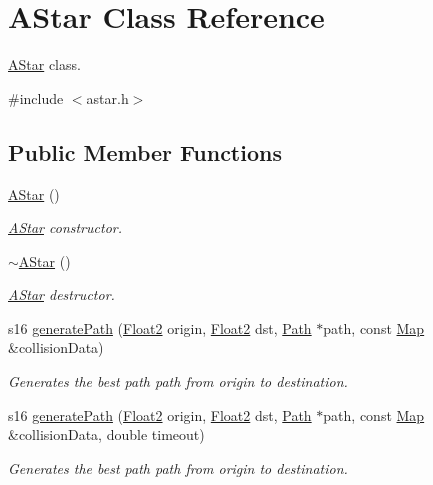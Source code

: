 \hypertarget{class_a_star}{}\section{A\+Star Class Reference}
\label{class_a_star}


\mbox{\hyperlink{class_a_star}{A\+Star}} class.  




{\ttfamily \#include $<$astar.\+h$>$}

\subsection*{Public Member Functions}
\begin{DoxyCompactItemize}
\item 
\mbox{\hyperlink{class_a_star_ab7cfaf9e1662f45f5fdce245d28c4508}{A\+Star}} ()
\begin{DoxyCompactList}\small\item\em \mbox{\hyperlink{class_a_star}{A\+Star}} constructor. \end{DoxyCompactList}\item 
\mbox{\hyperlink{class_a_star_ad246668465621db8818bbe3511fa4ae7}{$\sim$\+A\+Star}} ()
\begin{DoxyCompactList}\small\item\em \mbox{\hyperlink{class_a_star}{A\+Star}} destructor. \end{DoxyCompactList}\item 
s16 \mbox{\hyperlink{class_a_star_a1a6c23ad5e565a6ea84904eec5cf3968}{generate\+Path}} (\mbox{\hyperlink{class_float2}{Float2}} origin, \mbox{\hyperlink{class_float2}{Float2}} dst, \mbox{\hyperlink{class_path}{Path}} $\ast$path, const \mbox{\hyperlink{class_map}{Map}} \&collision\+Data)
\begin{DoxyCompactList}\small\item\em Generates the best path path from origin to destination. \end{DoxyCompactList}\item 
s16 \mbox{\hyperlink{class_a_star_a8d5afc67e0c5b63370c9af8e4e1e2683}{generate\+Path}} (\mbox{\hyperlink{class_float2}{Float2}} origin, \mbox{\hyperlink{class_float2}{Float2}} dst, \mbox{\hyperlink{class_path}{Path}} $\ast$path, const \mbox{\hyperlink{class_map}{Map}} \&collision\+Data, double timeout)
\begin{DoxyCompactList}\small\item\em Generates the best path path from origin to destination. \end{DoxyCompactList}\end{DoxyCompactItemize}


